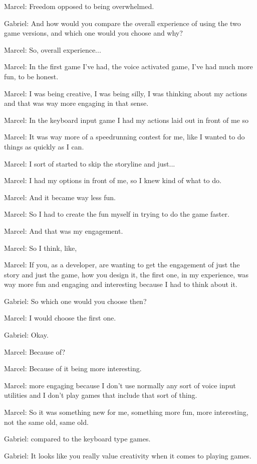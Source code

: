Marcel: Freedom opposed to being overwhelmed.

Gabriel: And how would you compare the overall experience of using the two game versions, and which one would you choose and why?

Marcel: So, overall experience...

Marcel: In the first game I've had, the voice activated game, I've had much more fun, to be honest.

Marcel: I was being creative, I was being silly, I was thinking about my actions and that was way more engaging in that sense.

Marcel: In the keyboard input game I had my actions laid out in front of me so

Marcel: It was way more of a speedrunning contest for me, like I wanted to do things as quickly as I can.

Marcel: I sort of started to skip the storyline and just...

Marcel: I had my options in front of me, so I knew kind of what to do.

Marcel: And it became way less fun.

Marcel: So I had to create the fun myself in trying to do the game faster.

Marcel: And that was my engagement.

Marcel: So I think, like,

Marcel: If you, as a developer, are wanting to get the engagement of just the story and just the game, how you design it, the first one, in my experience, was way more fun and engaging and interesting because I had to think about it.

Gabriel: So which one would you choose then?

Marcel: I would choose the first one.

Gabriel: Okay.

Marcel: Because of?

Marcel: Because of it being more interesting.

Marcel: more engaging because I don't use normally any sort of voice input utilities and I don't play games that include that sort of thing.

Marcel: So it was something new for me, something more fun, more interesting, not the same old, same old.

Gabriel: compared to the keyboard type games.

Gabriel: It looks like you really value creativity when it comes to playing games.

